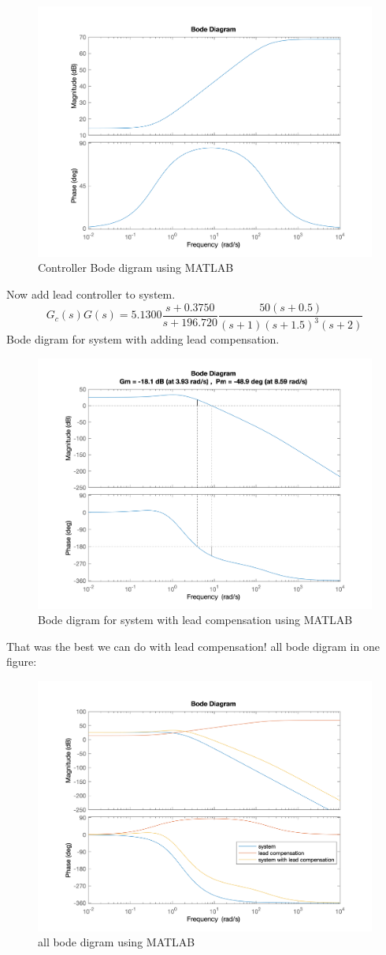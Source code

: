 \begin{figure}[H]
	\caption{Controller Bode digram using MATLAB}
	\centering
	\includegraphics[width=12cm]{../Figure/Q1/a/controller_bode.png}
\end{figure}
Now add lead controller to system.
$$
G_c(s)G(s) = 5.1300\dfrac{s + 0.3750}{s + 196.720} \dfrac{50(s+0.5)}{(s+1)(s+1.5)^{3}(s+2)}
$$
Bode digram for system with adding lead compensation.
\begin{figure}[H]
	\caption{Bode digram for system with lead compensation using MATLAB}
	\centering
	\includegraphics[width=12cm]{../Figure/Q1/a/new_margin.png}
\end{figure}
That was the best we can do with lead compensation!
all bode digram in one figure:
\begin{figure}[H]
	\caption{all bode digram using MATLAB}
	\centering
	\includegraphics[width=12cm]{../Figure/Q1/a/all_in_one.png}
\end{figure}